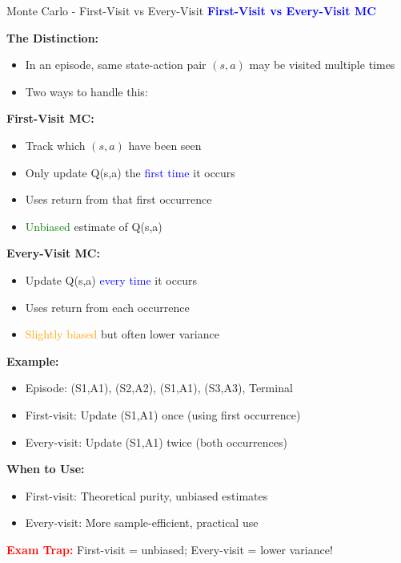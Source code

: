 \documentclass[8pt]{beamer}
\begin{document}
\begin{frame}{Monte Carlo - First-Visit vs Every-Visit}
\fontsize{6.5}{7.5}\selectfont
\textcolor{blue}{\textbf{First-Visit vs Every-Visit MC}}

\textbf{The Distinction:}
\begin{itemize}
\item In an episode, same state-action pair $(s,a)$ may be visited multiple times
\item Two ways to handle this:
\end{itemize}

\textbf{First-Visit MC:}
\begin{itemize}
\item Track which $(s,a)$ have been seen
\item Only update Q(s,a) the \textcolor{blue}{first time} it occurs
\item Uses return from that first occurrence
\item \textcolor{green}{Unbiased} estimate of Q(s,a)
\end{itemize}

\textbf{Every-Visit MC:}
\begin{itemize}
\item Update Q(s,a) \textcolor{blue}{every time} it occurs
\item Uses return from each occurrence
\item \textcolor{orange}{Slightly biased} but often lower variance
\end{itemize}

\textbf{Example:}
\begin{itemize}
\item Episode: (S1,A1), (S2,A2), (S1,A1), (S3,A3), Terminal
\item First-visit: Update (S1,A1) once (using first occurrence)
\item Every-visit: Update (S1,A1) twice (both occurrences)
\end{itemize}

\textbf{When to Use:}
\begin{itemize}
\item First-visit: Theoretical purity, unbiased estimates
\item Every-visit: More sample-efficient, practical use
\end{itemize}

\textcolor{red}{\textbf{Exam Trap:}} First-visit = unbiased; Every-visit = lower variance!
\end{frame}
\end{document}
